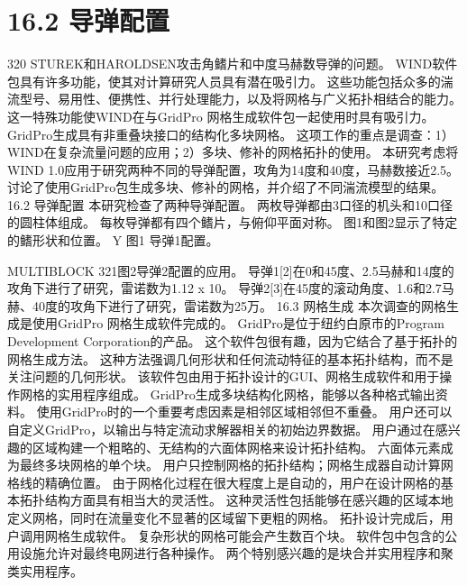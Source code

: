 \documentclass[UTF8,11pt,a4paper,openany,fontset=fandol]{ctexbook}
\begin{document}
\section{16.2 导弹配置}
320 STUREK和HAROLDSEN攻击角鳍片和中度马赫数导弹的问题。 WIND软件包具有许多功能，使其对计算研究人员具有潜在吸引力。 这些功能包括众多的湍流型号、易用性、便携性、并行处理能力，以及将网格与广义拓扑相结合的能力。 这一特殊功能使WIND在与GridPro 网格生成软件包一起使用时具有吸引力。 GridPro生成具有非重叠块接口的结构化多块网格。 这项工作的重点是调查：1）WIND在复杂流量问题的应用；2）多块、修补的网格拓扑的使用。 本研究考虑将WIND 1.0应用于研究两种不同的导弹配置，攻角为14度和40度，马赫数接近2.5。 讨论了使用GridPro包生成多块、修补的网格，并介绍了不同湍流模型的结果。 16.2 导弹配置 本研究检查了两种导弹配置。 两枚导弹都由3口径的机头和10口径的圆柱体组成。 每枚导弹都有四个鳍片，与俯仰平面对称。 图1和图2显示了特定的鳍形状和位置。 Y 图1 导弹1配置。

MULTIBLOCK 321图2导弹2配置的应用。 导弹1[2]在0和45度、2.5马赫和14度的攻角下进行了研究，雷诺数为1.12 x 10。 导弹2[3]在45度的滚动角度、1.6和2.7马赫、40度的攻角下进行了研究，雷诺数为25万。 16.3 网格生成 本次调查的网格生成是使用GridPro 网格生成软件完成的。 GridPro是位于纽约白原市的Program Development Corporation的产品。 这个软件包很有趣，因为它结合了基于拓扑的网格生成方法。 这种方法强调几何形状和任何流动特征的基本拓扑结构，而不是关注问题的几何形状。 该软件包由用于拓扑设计的GUI、网格生成软件和用于操作网格的实用程序组成。 GridPro生成多块结构化网格，能够以各种格式输出资料。 使用GridPro时的一个重要考虑因素是相邻区域相邻但不重叠。 用户还可以自定义GridPro，以输出与特定流动求解器相关的初始边界数据。 用户通过在感兴趣的区域构建一个粗略的、无结构的六面体网格来设计拓扑结构。 六面体元素成为最终多块网格的单个块。 用户只控制网格的拓扑结构；网格生成器自动计算网格线的精确位置。 由于网格化过程在很大程度上是自动的，用户在设计网格的基本拓扑结构方面具有相当大的灵活性。 这种灵活性包括能够在感兴趣的区域本地定义网格，同时在流量变化不显著的区域留下更粗的网格。 拓扑设计完成后，用户调用网格生成软件。 复杂形状的网格可能会产生数百个块。 软件包中包含的公用设施允许对最终电网进行各种操作。 两个特别感兴趣的是块合并实用程序和聚类实用程序。
\end{document}
